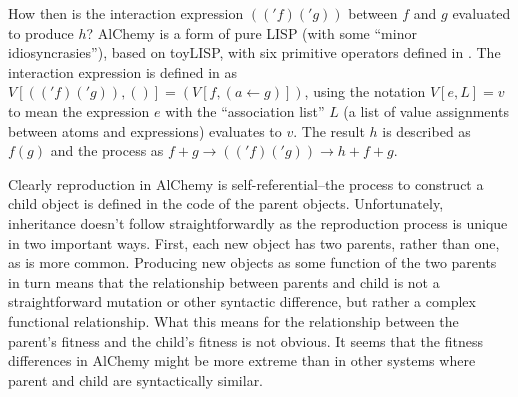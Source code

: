 How then is the interaction expression $(('f)('g))$ between $f$ and $g$ evaluated to produce $h$? AlChemy is a form of pure LISP (with some ``minor idiosyncrasies''), based on toyLISP, with six primitive operators defined in \cite[p.205]{Fontana1992}. The interaction expression is defined in \cite[Definition A.9, p.204]{Fontana1992} as $V[(('f)('g)),()] = (V[f,(a\leftarrow g)])$, using the notation $V[e,L]=v$ to mean the expression $e$ with the ``association list'' $L$ (a list of value assignments between atoms and expressions) evaluates to $v$. The result $h$ is described as $f(g)$ and the process as $f+g \rightarrow (('f)('g)) \rightarrow h + f + g$.

Clearly reproduction in AlChemy is self-referential--the process to construct a child object is defined in the code of the parent objects. Unfortunately, inheritance doesn't follow straightforwardly as the reproduction process is unique in two important ways. First, each new object has two parents, rather than one, as is more common. Producing new objects as some function of the two parents in turn means that the relationship between parents and child is not a straightforward mutation or other syntactic difference, but rather a complex functional relationship. What this means for the relationship between the parent's fitness and the child's fitness is not obvious. It seems that the fitness differences in AlChemy might be more extreme than in other systems where parent and child are syntactically similar.

